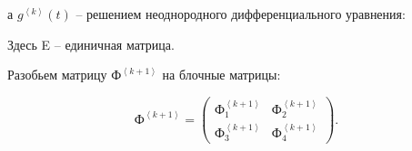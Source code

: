 
а \(g^{\left\langle k \right\rangle}(t)\) -- решением неоднородного
дифференциального уравнения:


Здесь E -- единичная матрица.

Разобьем матрицу \(Ф^{\left\langle k + 1 \right\rangle}\) на блочные
матрицы:

\[Ф^{\left\langle k + 1 \right\rangle} = \begin{pmatrix}
Ф_{1}^{\left\langle k + 1 \right\rangle} & Ф_{2}^{\left\langle k + 1 \right\rangle} \\
Ф_{3}^{\left\langle k + 1 \right\rangle} & Ф_{4}^{\left\langle k + 1 \right\rangle}
\end{pmatrix}.\]

